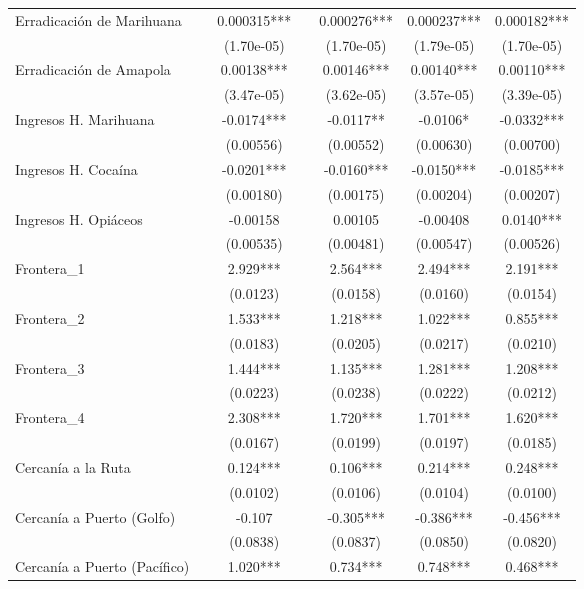 {\begin{tabular}{lcccccc}
\rowcolor{Blue}Erradicación de Marihuana &  & 0.000315*** &  & 0.000276*** & 0.000237*** & 0.000182*** \\
 &  & (1.70e-05) &  & (1.70e-05) & (1.79e-05) & (1.70e-05) \\
\rowcolor{Blue}Erradicación de Amapola &  & 0.00138*** &  & 0.00146*** & 0.00140*** & 0.00110*** \\
 &  & (3.47e-05) &  & (3.62e-05) & (3.57e-05) & (3.39e-05) \\
\rowcolor{Blue}Ingresos H. Marihuana &  & -0.0174*** &  & -0.0117** & -0.0106* & -0.0332*** \\
 &  & (0.00556) &  & (0.00552) & (0.00630) & (0.00700) \\
\rowcolor{Blue}Ingresos H. Cocaína  &  & -0.0201*** &  & -0.0160*** & -0.0150*** & -0.0185*** \\
 &  & (0.00180) &  & (0.00175) & (0.00204) & (0.00207) \\
\rowcolor{Blue}Ingresos H. Opiáceos  &  & -0.00158 &  & 0.00105 & -0.00408 & 0.0140*** \\
 &  & (0.00535) &  & (0.00481) & (0.00547) & (0.00526) \\
\rowcolor{Blue}Frontera_1 &  & 2.929*** &  & 2.564*** & 2.494*** & 2.191*** \\
 &  & (0.0123) &  & (0.0158) & (0.0160) & (0.0154) \\
\rowcolor{Blue}Frontera_2 &  & 1.533*** &  & 1.218*** & 1.022*** & 0.855*** \\
 &  & (0.0183) &  & (0.0205) & (0.0217) & (0.0210) \\
\rowcolor{Blue}Frontera_3 &  & 1.444*** &  & 1.135*** & 1.281*** & 1.208*** \\
 &  & (0.0223) &  & (0.0238) & (0.0222) & (0.0212) \\
\rowcolor{Blue}Frontera_4 &  & 2.308*** &  & 1.720*** & 1.701*** & 1.620*** \\
 &  & (0.0167) &  & (0.0199) & (0.0197) & (0.0185) \\
\rowcolor{Blue}Cercanía a la Ruta &  & 0.124*** &  & 0.106*** & 0.214*** & 0.248*** \\
 &  & (0.0102) &  & (0.0106) & (0.0104) & (0.0100) \\
\rowcolor{Blue}Cercanía a Puerto (Golfo)  &  & -0.107 &  & -0.305*** & -0.386*** & -0.456*** \\
 &  & (0.0838) &  & (0.0837) & (0.0850) & (0.0820) \\
\rowcolor{Blue}Cercanía a Puerto (Pacífico) &  & 1.020*** &  & 0.734*** & 0.748*** & 0.468*** \\

\end{tabular}}
